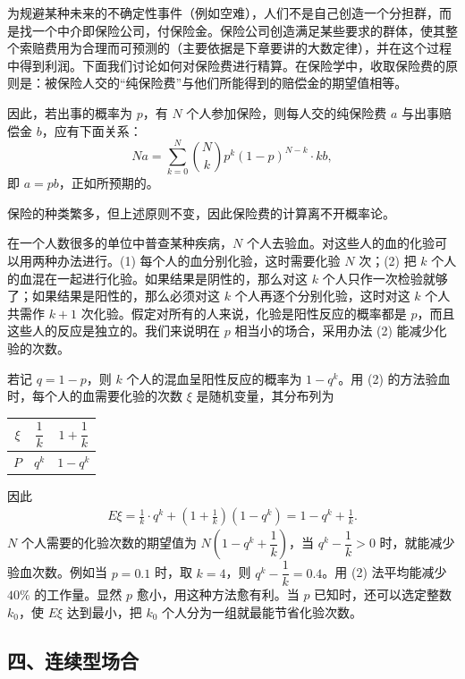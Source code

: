 \documentclass[../../main.tex]{subfiles}
\begin{document}
\begin{example}[保险]\label{example:ch04-保险}
为规避某种未来的不确定性事件（例如空难），人们不是自己创造一个分担群，而是找一个中介即保险公司，付保险金。保险公司创造满足某些要求的群体，使其整个索赔费用为合理而可预测的（主要依据是下章要讲的大数定律），并在这个过程中得到利润。下面我们讨论如何对保险费进行精算。在保险学中，收取保险费的原则是：被保险人交的``纯保险费''与他们所能得到的赔偿金的期望值相等。

因此，若出事的概率为 $p$，有 $N$ 个人参加保险，则每人交的纯保险费 $a$ 与出事赔偿金 $b$，应有下面关系：
\[
Na=\sum_{k=0}^N \binom{N}{k}p^k(1-p)^{N-k}\cdot kb,
\]
即 $a=pb$，正如所预期的。

保险的种类繁多，但上述原则不变，因此保险费的计算离不开概率论。
\end{example}

\begin{example}[一种验血新技术]\label{example:ch04-验血}
在一个人数很多的单位中普查某种疾病，$N$ 个人去验血。对这些人的血的化验可以用两种办法进行。(1) 每个人的血分别化验，这时需要化验 $N$ 次；(2) 把 $k$ 个人的血混在一起进行化验。如果结果是阴性的，那么对这 $k$ 个人只作一次检验就够了；如果结果是阳性的，那么必须对这 $k$ 个人再逐个分别化验，这时对这 $k$ 个人共需作 $k+1$ 次化验。假定对所有的人来说，化验是阳性反应的概率都是 $p$，而且这些人的反应是独立的。我们来说明在 $p$ 相当小的场合，采用办法 (2) 能减少化验的次数。

若记 $q=1-p$，则 $k$ 个人的混血呈阳性反应的概率为 $1-q^k$。用 (2) 的方法验血时，每个人的血需要化验的次数 $\xi$ 是随机变量，其分布列为
\begin{center}
\begin{tabular}{c|cc}
$\xi$ & $\dfrac{1}{k}$ & $1+\dfrac{1}{k}$\\
\hline
$P$ & $q^k$ & $1-q^k$
\end{tabular}
\end{center}
因此
\begin{align*}
E\xi=\frac{1}{k}\cdot q^k+\left(1+\frac{1}{k}\right)(1-q^k)=1-q^k+\frac{1}{k}.
\end{align*}
$N$ 个人需要的化验次数的期望值为 $N\left(1-q^k+\dfrac{1}{k}\right)$，当 $q^k-\dfrac{1}{k}>0$ 时，就能减少验血次数。例如当 $p=0.1$ 时，取 $k=4$，则 $q^k-\dfrac{1}{k}=0.4$。用 (2) 法平均能减少 $40\%$ 的工作量。显然 $p$ 愈小，用这种方法愈有利。当 $p$ 已知时，还可以选定整数 $k_0$，使 $E\xi$ 达到最小，把 $k_0$ 个人分为一组就最能节省化验次数。
\end{example}

\subsection*{四、连续型场合}
\end{document}
